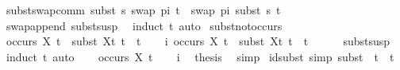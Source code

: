 \begin{isabellebody}
\isamarkupfalse%
\ subst{\isacharunderscore}{\kern0pt}swap{\isacharunderscore}{\kern0pt}comm{\isacharcolon}{\kern0pt}\ {\isachardoublequoteopen}subst\ s\ {\isacharparenleft}{\kern0pt}swap\ pi\ t{\isacharparenright}{\kern0pt}\ {\isacharequal}{\kern0pt}\ swap\ pi\ {\isacharparenleft}{\kern0pt}subst\ s\ t{\isacharparenright}{\kern0pt}{\isachardoublequoteclose}\isanewline
%
\isadelimproof
\ \ %
\endisadelimproof
%
\isatagproof
{}\isamarkupfalse%
\ swap{\isacharunderscore}{\kern0pt}append\ subst{\isacharunderscore}{\kern0pt}susp\ \isamarkupfalse%
\ {\isacharparenleft}{\kern0pt}induct\ t{\isacharparenright}{\kern0pt}\ auto%
\endisatagproof
{\isafoldproof}%
%
\isadelimproof
\isanewline
%
\endisadelimproof
\isanewline
{}\isamarkupfalse%
\ subst{\isacharunderscore}{\kern0pt}not{\isacharunderscore}{\kern0pt}occurs{\isacharcolon}{\kern0pt}\ \isanewline
\ {\isachardoublequoteopen}{\isasymnot}{\isacharparenleft}{\kern0pt}occurs\ X\ t{\isacharparenright}{\kern0pt}\ {\isasymLongrightarrow}\ subst\ {\isacharbrackleft}{\kern0pt}{\isacharparenleft}{\kern0pt}X{\isacharcomma}{\kern0pt}t{}{\isacharparenright}{\kern0pt}{\isacharbrackright}{\kern0pt}\ t\ {\isacharequal}{\kern0pt}\ t{\isachardoublequoteclose}\isanewline
%
\isadelimproof
%
\endisadelimproof
%
\isatagproof
{}\isamarkupfalse%
{\isacharminus}{\kern0pt}\isanewline
\ \ \isamarkupfalse%
\ i{\isacharcolon}{\kern0pt}\ {\isachardoublequoteopen}{\isasymnot}{\isacharparenleft}{\kern0pt}occurs\ X\ t{\isacharparenright}{\kern0pt}\ {\isasymlongrightarrow}\ subst\ {\isacharbrackleft}{\kern0pt}{\isacharparenleft}{\kern0pt}X{\isacharcomma}{\kern0pt}t{}{\isacharparenright}{\kern0pt}{\isacharbrackright}{\kern0pt}\ t\ {\isacharequal}{\kern0pt}\ t{\isachardoublequoteclose}\isanewline
\ \ \ \ \isamarkupfalse%
\ subst{\isacharunderscore}{\kern0pt}susp\ \isamarkupfalse%
\ {\isacharparenleft}{\kern0pt}induct\ t{\isacharparenright}{\kern0pt}\ auto\isanewline
\ \ \isamarkupfalse%
\ {\isachardoublequoteopen}{\isasymnot}{\isacharparenleft}{\kern0pt}occurs\ X\ t{\isacharparenright}{\kern0pt}{\isachardoublequoteclose}\isanewline
\ \ \isamarkupfalse%
\ i\ \isamarkupfalse%
\ {\isacharquery}{\kern0pt}thesis\ \isamarkupfalse%
\ simp\isanewline
{}\isamarkupfalse%
%
\endisatagproof
{\isafoldproof}%
%
\isadelimproof
\isanewline
%
\endisadelimproof
\isanewline
\isanewline
{}\isamarkupfalse%
\ id{\isacharunderscore}{\kern0pt}subst\ {\isacharbrackleft}{\kern0pt}simp{\isacharbrackright}{\kern0pt}{\isacharcolon}{\kern0pt}\ {\isachardoublequoteopen}subst\ {\isacharbrackleft}{\kern0pt}{\isacharbrackright}{\kern0pt}\ t\ {\isacharequal}{\kern0pt}\ t{\isachardoublequoteclose}\isanewline

\end{isabellebody}
